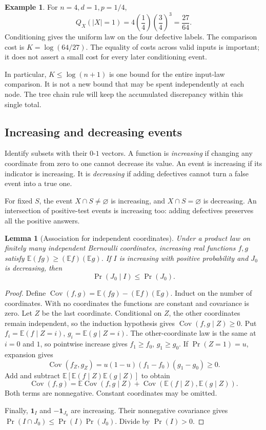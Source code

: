 \documentclass[11pt]{article}
\newtheorem{lemma}[theorem]{Lemma}
\theoremstyle{definition}
\newtheorem{example}[theorem]{Example}
\theoremstyle{remark}
\newcommand{\E}{\mathbb E}
\numberwithin{equation}{section}
\begin{document}
\begin{example}
For \(n=4,d=1,p=1/4\),
\[
 Q_X(|X|=1)=4\left(\frac14\right)\left(\frac34\right)^3
 =\frac{27}{64}.
\]
Conditioning gives the uniform law on the four defective labels.
The comparison cost is \(K=\log(64/27)\).
The equality of costs across valid inputs is important; it does not
assert a small cost for every later conditioning event.
\end{example}

In particular, \(K\le\log(n+1)\) is one bound for the entire input-law
comparison. It is not a new bound that may be spent independently at
each node. The tree chain rule will keep the accumulated discrepancy
within this single total.

\subsection{Increasing and decreasing events}

Identify subsets with their \(0\)-\(1\) vectors. A function is
\emph{increasing} if changing any coordinate from zero to one cannot
decrease its value. An event is increasing if its indicator is
increasing. It is \emph{decreasing} if adding defectives cannot turn
a false event into a true one.

For fixed \(S\), the event \(X\cap S\ne\varnothing\) is increasing,
and \(X\cap S=\varnothing\) is decreasing.
An intersection of positive-test events is increasing too: adding
defectives preserves all the positive answers.

\begin{lemma}[Association for independent coordinates]\label{lem:association}
Under a product law on finitely many independent Bernoulli coordinates,
increasing real functions \(f,g\) satisfy \(\E(fg)\ge(\E f)(\E g)\).
If \(I\) is increasing with positive probability and \(J_0\) is
decreasing, then
\begin{equation}\label{eq:association}
 \Pr(J_0\mid I)\le\Pr(J_0).
\end{equation}
\end{lemma}
\begin{proof}
Define \(\operatorname{Cov}(f,g)=\E(fg)-(\E f)(\E g)\).
Induct on the number of coordinates. With no coordinates the
functions are constant and covariance is zero.
Let \(Z\) be the last coordinate. Conditional on \(Z\), the other
coordinates remain independent, so the induction hypothesis gives
\(\operatorname{Cov}(f,g\mid Z)\ge0\).
Put \(f_i=\E(f\mid Z=i)\), \(g_i=\E(g\mid Z=i)\).
The other-coordinate law is the same at \(i=0\) and \(1\), so
pointwise increase gives \(f_1\ge f_0\), \(g_1\ge g_0\).
If \(\Pr(Z=1)=u\), expansion gives
\[
 \operatorname{Cov}(f_Z,g_Z)=u(1-u)(f_1-f_0)(g_1-g_0)\ge0.
\]
Add and subtract \(\E[\E(f\mid Z)\E(g\mid Z)]\) to obtain
\[
 \operatorname{Cov}(f,g)
 =\E\operatorname{Cov}(f,g\mid Z)
  +\operatorname{Cov}(\E(f\mid Z),\E(g\mid Z)).
\]
Both terms are nonnegative. Constant coordinates may be omitted.

Finally, \(\mathbf1_I\) and \(-\mathbf1_{J_0}\) are increasing.
Their nonnegative covariance gives
\(\Pr(I\cap J_0)\le\Pr(I)\Pr(J_0)\).
Divide by \(\Pr(I)>0\).
\end{proof}
\end{document}
